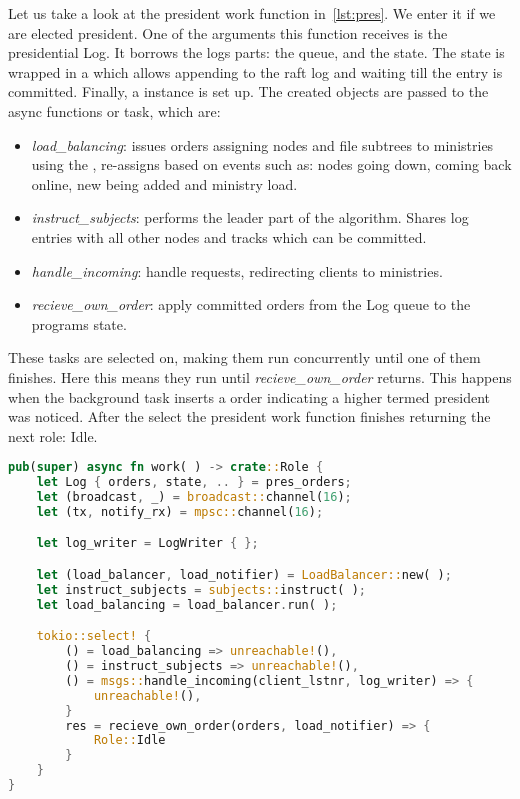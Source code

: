 Let us take a look at the president work function in~\cref{lst:pres}. We enter it if we are elected president. One of the arguments this function receives is the presidential \raft{} Log. It borrows the logs parts: the queue, and the \raft{} state. The state is wrapped in a  which allows appending to the raft log and waiting till the entry is committed. Finally, a  instance is set up. The created objects are passed to the async functions or task, which are: 
\begin{itemize}
	\item \textsl{load\_balancing}: issues orders assigning nodes and file subtrees to ministries using the , re-assigns based on events such as: nodes going down, coming back online, new being added and ministry load.
	\item \textsl{instruct\_subjects}: performs the leader part of the \raft{} algorithm. Shares log entries with all other nodes and tracks which can be committed.
	\item \textsl{handle\_incoming}: handle requests, redirecting clients to ministries.
	\item \textsl{recieve\_own\_order}: apply committed orders from the \raft{} Log queue to the programs state.
\end{itemize}
%
These tasks are selected on, making them run concurrently until one of them finishes. Here this means they run until \textsl{recieve\_own\_order} returns. This happens when the \raft{} background task inserts a  order indicating a higher termed president was noticed. After the select the president work function finishes returning the next role: Idle.

%
\begin{lstlisting}[float,language=rust,style=boxed,tabsize=2,caption={The president work function, it performs all the tasks of the president. In this code snippet brackets and parenthesis containing whitespace mean the corrosponding structs and functions have there arguments hidden for brevity},label=lst:pres]
pub(super) async fn work( ) -> crate::Role {
	let Log { orders, state, .. } = pres_orders;
	let (broadcast, _) = broadcast::channel(16);
	let (tx, notify_rx) = mpsc::channel(16);

	let log_writer = LogWriter { };

	let (load_balancer, load_notifier) = LoadBalancer::new( );
	let instruct_subjects = subjects::instruct( );
	let load_balancing = load_balancer.run( );

	tokio::select! {
		() = load_balancing => unreachable!(),
		() = instruct_subjects => unreachable!(),
		() = msgs::handle_incoming(client_lstnr, log_writer) => {
			unreachable!(),
		}
		res = recieve_own_order(orders, load_notifier) => {
			Role::Idle
		}
	}
}
\end{lstlisting}


